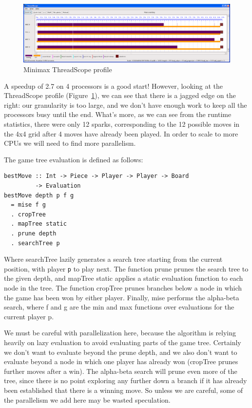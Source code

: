 \documentclass[twocolumn,9pt]{sigplanconf}
\newcommand{\codef}[1]{{\fontfamily{cmss}\small#1}}
\begin{document}
\begin{figure}
\begin{center}
\includegraphics[scale=0.3]{minimax1.png}
\end{center}
\caption{Minimax ThreadScope profile}
\label{f:minimax-threadscope1}
\end{figure}

A speedup of 2.7 on 4 processors is a good start!  However, looking at
the ThreadScope profile (Figure~\ref{f:minimax-threadscope1}), we can
see that there is a jagged edge on the right: our granularity is too
large, and we don't have enough work to keep all the processors busy
until the end.  What's more, as we can see from the runtime
statistics, there were only 12 sparks, corresponding to the 12
possible moves in the 4x4 grid after 4 moves have already been played.
In order to scale to more CPUs we will need to find more parallelism.

The game tree evaluation is defined as follows:

\begin{lstlisting}[columns=flexible]
bestMove :: Int -> Piece -> Player -> Player -> Board
         -> Evaluation
bestMove depth p f g 
  = mise f g 
  . cropTree
  . mapTree static
  . prune depth
  . searchTree p
\end{lstlisting}

Where \codef{searchTree} lazily generates a search tree starting
from the current position, with player \texttt{p} to play next.  The
function \codef{prune} prunes the search tree to the given depth, and
\codef{mapTree static} applies a static evaluation function to each
node in the tree.  The function \codef{cropTree} prunes branches below
a node in which the game has been won by either player.  Finally,
\codef{mise} performs the alpha-beta search, where \codef{f} and
\codef{g} are the min and max functions over evaluations for the
current player \codef{p}.

We must be careful with parallelization here, because the algorithm is
relying heavily on lazy evaluation to avoid evaluating parts of the
game tree.  Certainly we don't want to evaluate beyond the prune
depth, and we also don't want to evaluate beyond a node in which one
player has already won (\codef{cropTree} prunes further moves after a
win).  The alpha-beta search will prune even more of the tree, since
there is no point exploring any further down a branch if it has
already been established that there is a winning move.  So unless we
are careful, some of the parallelism we add here may be wasted
speculation.
\end{document}
